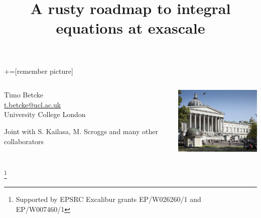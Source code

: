 \documentclass[dvipsnames,10pt]{beamer}
\title{A rusty roadmap to integral equations at exascale}
\date{}
\newcommand\blfootnote[1]{%
  \begingroup
  \renewcommand\thefootnote{}\footnote{#1}%
  \addtocounter{footnote}{-1}%
  \endgroup
}
\begin{document}
\lstset{language=Python}
+=[remember picture]
\begin{frame}

\vspace{1cm}

\titlepage
\vspace{-2cm}
\begin{columns}[T]
\begin{column}{.48\textwidth}
\begin{center}
    Timo Betcke \\
    \url{t.betcke@ucl.ac.uk}\\
    University College London
\end{center}
\begin{tcolorbox}
Joint with S. Kailasa, M. Scroggs and many
other collaborators
\end{tcolorbox}
\end{column}%
\hfill%
\begin{column}{.48\textwidth}
\includegraphics[width=5cm]{../figs/ucl_campus}

\end{column}%
\end{columns}

\blfootnote{\tiny Supported by EPSRC Excalibur grants EP/W026260/1 and EP/W007460/1}

\end{frame}
\end{document}
